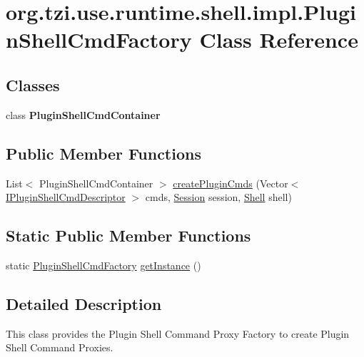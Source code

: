 \hypertarget{classorg_1_1tzi_1_1use_1_1runtime_1_1shell_1_1impl_1_1_plugin_shell_cmd_factory}{\section{org.\-tzi.\-use.\-runtime.\-shell.\-impl.\-Plugin\-Shell\-Cmd\-Factory Class Reference}
\label{classorg_1_1tzi_1_1use_1_1runtime_1_1shell_1_1impl_1_1_plugin_shell_cmd_factory}
}
\subsection*{Classes}
\begin{DoxyCompactItemize}
\item 
class {\bfseries Plugin\-Shell\-Cmd\-Container}
\end{DoxyCompactItemize}
\subsection*{Public Member Functions}
\begin{DoxyCompactItemize}
\item 
List$<$ Plugin\-Shell\-Cmd\-Container $>$ \hyperlink{classorg_1_1tzi_1_1use_1_1runtime_1_1shell_1_1impl_1_1_plugin_shell_cmd_factory_a51b972262dc3e8e24c8d3849018a49e4}{create\-Plugin\-Cmds} (Vector$<$ \hyperlink{interfaceorg_1_1tzi_1_1use_1_1runtime_1_1shell_1_1_i_plugin_shell_cmd_descriptor}{I\-Plugin\-Shell\-Cmd\-Descriptor} $>$ cmds, \hyperlink{classorg_1_1tzi_1_1use_1_1main_1_1_session}{Session} session, \hyperlink{classorg_1_1tzi_1_1use_1_1main_1_1shell_1_1_shell}{Shell} shell)
\end{DoxyCompactItemize}
\subsection*{Static Public Member Functions}
\begin{DoxyCompactItemize}
\item 
static \hyperlink{classorg_1_1tzi_1_1use_1_1runtime_1_1shell_1_1impl_1_1_plugin_shell_cmd_factory}{Plugin\-Shell\-Cmd\-Factory} \hyperlink{classorg_1_1tzi_1_1use_1_1runtime_1_1shell_1_1impl_1_1_plugin_shell_cmd_factory_ab23795bc50f8f37a73132e25d944fa56}{get\-Instance} ()
\end{DoxyCompactItemize}


\subsection{Detailed Description}
This class provides the Plugin Shell Command Proxy Factory to create Plugin Shell Command Proxies.

